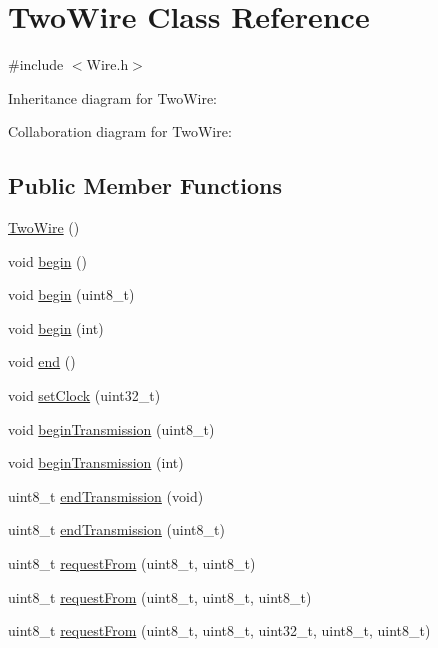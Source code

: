 \hypertarget{class_two_wire}{}\section{Two\+Wire Class Reference}
\label{class_two_wire}


{\ttfamily \#include $<$Wire.\+h$>$}



Inheritance diagram for Two\+Wire\+:


Collaboration diagram for Two\+Wire\+:
\subsection*{Public Member Functions}
\begin{DoxyCompactItemize}
\item 
\hyperlink{class_two_wire_a4c7daf378c06e5e72762e1bd3d5937b6}{Two\+Wire} ()
\item 
void \hyperlink{class_two_wire_ada85a7a8663ec8af0a1248b659be2f18}{begin} ()
\item 
void \hyperlink{class_two_wire_a28bca087ed188781ef15e72622d3b1fb}{begin} (uint8\+\_\+t)
\item 
void \hyperlink{class_two_wire_a2806aa5684d36d7d20bf7c51cab3e602}{begin} (int)
\item 
void \hyperlink{class_two_wire_a13cca813f6dd0201ac70178b18ba0946}{end} ()
\item 
void \hyperlink{class_two_wire_a3c4aaae8779a8c34d8a1a90ff317d982}{set\+Clock} (uint32\+\_\+t)
\item 
void \hyperlink{class_two_wire_a8d55f00ea8ac3d7427d62e0c71e95ec2}{begin\+Transmission} (uint8\+\_\+t)
\item 
void \hyperlink{class_two_wire_a4da95eb4adced5dad152344243e57aad}{begin\+Transmission} (int)
\item 
uint8\+\_\+t \hyperlink{class_two_wire_af80f9a7b85a3a81a035ca94c95bcdc1d}{end\+Transmission} (void)
\item 
uint8\+\_\+t \hyperlink{class_two_wire_a289f5ef9bb0f79b31095fd72402ed54a}{end\+Transmission} (uint8\+\_\+t)
\item 
uint8\+\_\+t \hyperlink{class_two_wire_ae27d0936487551a05a1e9901bc456599}{request\+From} (uint8\+\_\+t, uint8\+\_\+t)
\item 
uint8\+\_\+t \hyperlink{class_two_wire_a4b4b618531a04d5488a52583a3dfb173}{request\+From} (uint8\+\_\+t, uint8\+\_\+t, uint8\+\_\+t)
\item 
uint8\+\_\+t \hyperlink{class_two_wire_acd59cc9570fd49b1cf9044cbefef85ac}{request\+From} (uint8\+\_\+t, uint8\+\_\+t, uint32\+\_\+t, uint8\+\_\+t, uint8\+\_\+t)

\end{DoxyCompactItemize}
